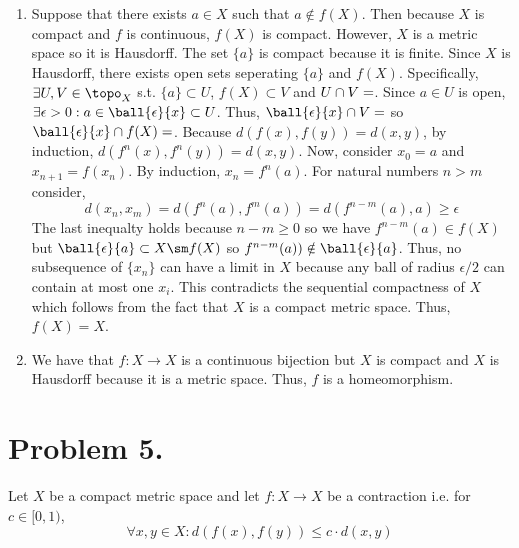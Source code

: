 \documentclass[12pt]{extarticle}
\begin{document}
\begin{enumerate}
\item
Suppose that there exists $a \in X$ such that $a \notin f(X)$. Then because $X$ is compact and $f$ is continuous, $f(X)$ is compact. However, $X$ is a metric space so it is Hausdorff. The set $\{a\}$ is compact because it is finite. Since $X$ is Hausdorff, there exists open sets seperating $\{a\}$ and $f(X)$. Specifically, $\exists U, V \in \topo_X$ s.t. $\{a \} \subset U$, $f(X) \subset V$ and $U \cap V = \empty$. Since $a \in U$ is open, $\exists \epsilon > 0 : a \in \ball{\epsilon}{x} \subset U$. Thus, $\ball{\epsilon}{x} \cap V = \empty$ so $\ball{\epsilon}{x} \cap f(X) = \empty$. Because $d(f(x), f(y)) = d(x, y)$, by induction, $d(f^n(x), f^n(y)) = d(x, y)$. Now, consider $x_0 = a$ and $x_{n+1} = f(x_n)$. By induction, $x_n =  f^{n}(a)$. For natural numbers $n > m$ consider, 
\[d(x_n, x_m) = d(f^{n}(a), f^{m}(a)) = d(f^{n - m}(a), a) \ge \epsilon\] 
The last inequalty holds because $n - m \ge 0$ so we have $f^{n-m}(a) \in f(X)$ but $\ball{\epsilon}{a} \subset X \sm f(X)$ so $f^{n-m}(a)) \notin \ball{\epsilon}{a}$. Thus, no subsequence of $\{x_n\}$ can have a limit in $X$ because any ball of radius $\epsilon/2$ can contain at most one $x_i$. This contradicts the sequential compactness of $X$ which follows from the fact that $X$ is a compact metric space. Thus, $f(X) = X$.   

\item We have that $f : X \to X$ is a continuous bijection but $X$ is compact and $X$ is Hausdorff because it is a metric space. Thus, $f$ is a homeomorphism. 
\end{enumerate}   

\section*{Problem 5.}
Let $X$ be a compact metric space and let $f : X \to X$ be a contraction i.e. for $c \in [0, 1)$, \[\forall x, y \in X : d(f(x), f(y)) \le c \cdot d(x, y)\]
\end{document}
